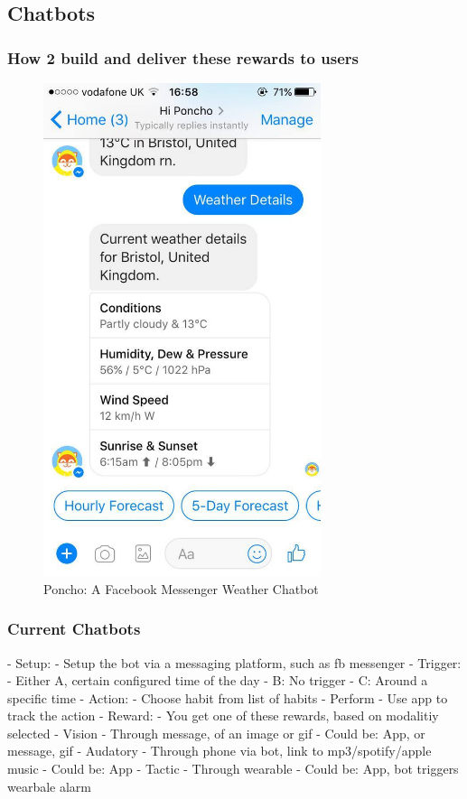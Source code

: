 \subsection{Chatbots}

\subsubsection*{How 2 build and deliver these rewards to users}


\begin{figure}[ht] %
    \centering
    \includegraphics[width=3.2in]{../resources/poncho.jpg}
    \caption{Poncho: A Facebook Messenger Weather Chatbot}
    \label{fig:poncho}
\end{figure}

\subsubsection*{Current Chatbots}

  - Setup:
    - Setup the bot via a messaging platform, such as fb messenger
  - Trigger:
      - Either A, certain configured time of the day
      -        B: No trigger
      -        C: Around a specific time
  - Action:
    - Choose habit from list of habits
    - Perform
    - Use app to track the action
  - Reward:
    - You get one of these rewards, based on modalitiy selected
    - Vision
      - Through message, of an image or gif
      - Could be: App, or message, gif
    - Audatory
      - Through phone via bot, link to mp3/spotify/apple music
      - Could be: App
    - Tactic
      - Through wearable
      - Could be: App, bot triggers wearbale alarm

